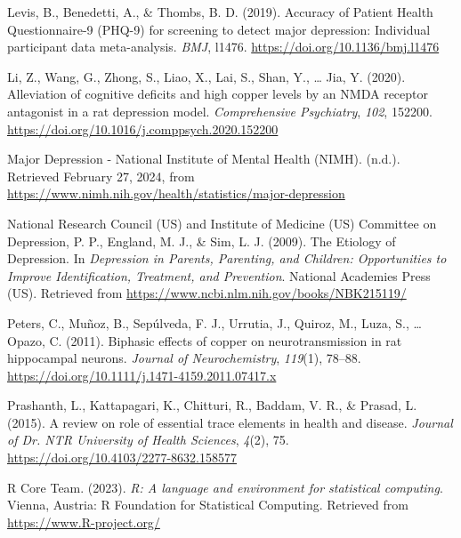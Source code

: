 \documentclass[
  man,floatsintext]{apa6}
\newlength{\cslhangindent}
\newlength{\cslentryspacingunit} %
\newenvironment{CSLReferences}[2] %
 {%
  \setlength{\parindent}{0pt}
  \ifodd #1
  \let\oldpar\par
  \def\par{\hangindent=\cslhangindent\oldpar}
  \fi
  \setlength{\parskip}{#2\cslentryspacingunit}
 }%
 {}
\begin{document}
\begin{CSLReferences}{1}{0}
\leavevmode{}%
Levis, B., Benedetti, A., \& Thombs, B. D. (2019). Accuracy of {Patient Health Questionnaire-9} ({PHQ-9}) for screening to detect major depression: Individual participant data meta-analysis. \emph{BMJ}, l1476. \url{https://doi.org/10.1136/bmj.l1476}

\leavevmode{}%
Li, Z., Wang, G., Zhong, S., Liao, X., Lai, S., Shan, Y., \ldots{} Jia, Y. (2020). Alleviation of cognitive deficits and high copper levels by an {NMDA} receptor antagonist in a rat depression model. \emph{Comprehensive Psychiatry}, \emph{102}, 152200. \url{https://doi.org/10.1016/j.comppsych.2020.152200}

\leavevmode{}%
Major {Depression} - {National Institute} of {Mental Health} ({NIMH}). (n.d.). Retrieved February 27, 2024, from \url{https://www.nimh.nih.gov/health/statistics/major-depression}

\leavevmode{}%
National Research Council (US) and Institute of Medicine (US) Committee on Depression, P. P., England, M. J., \& Sim, L. J. (2009). The {Etiology} of {Depression}. In \emph{Depression in {Parents}, {Parenting}, and {Children}: {Opportunities} to {Improve Identification}, {Treatment}, and {Prevention}}. {National Academies Press (US)}. Retrieved from \url{https://www.ncbi.nlm.nih.gov/books/NBK215119/}

\leavevmode{}%
Peters, C., Muñoz, B., Sepúlveda, F. J., Urrutia, J., Quiroz, M., Luza, S., \ldots{} Opazo, C. (2011). Biphasic effects of copper on neurotransmission in rat hippocampal neurons. \emph{Journal of Neurochemistry}, \emph{119}(1), 78--88. \url{https://doi.org/10.1111/j.1471-4159.2011.07417.x}

\leavevmode{}%
Prashanth, L., Kattapagari, K., Chitturi, R., Baddam, V. R., \& Prasad, L. (2015). A review on role of essential trace elements in health and disease. \emph{Journal of Dr. NTR University of Health Sciences}, \emph{4}(2), 75. \url{https://doi.org/10.4103/2277-8632.158577}

\leavevmode{}%
R Core Team. (2023). \emph{R: A language and environment for statistical computing}. Vienna, Austria: R Foundation for Statistical Computing. Retrieved from \url{https://www.R-project.org/}


\end{CSLReferences}
\end{document}
